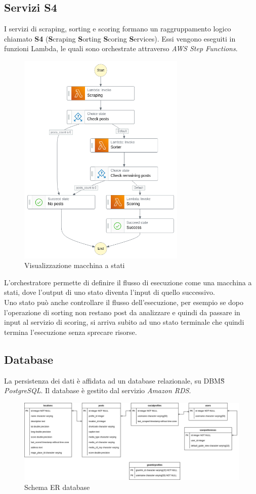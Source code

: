 \subsection{Servizi S4}
I servizi di scraping, sorting e scoring formano un raggruppamento logico chiamato \textbf{S4} (\textbf{S}craping \textbf{S}orting \textbf{S}coring \textbf{S}ervices).
Essi vengono eseguiti in funzioni Lambda, le quali sono orchestrate attraverso \textit{AWS Step Functions}.
\begin{figure}[H]
    \includegraphics[width=8cm]{sezioni/images/stepfunctions_graph.png}
    \centering
    \caption{Visualizzazione macchina a stati}
\end{figure}
L'orchestratore permette di definire il flusso di esecuzione come una macchina a stati, dove l'output di uno stato
diventa l'input di quello successivo.\\
Uno stato può anche controllare il flusso dell'esecuzione, per esempio se dopo
l'operazione di sorting non restano post da analizzare e quindi da passare in input al servizio di scoring, si arriva
subito ad uno stato terminale che quindi termina l'esecuzione senza sprecare risorse.

\newpage

\subsection{Database}
La persistenza dei dati è affidata ad un database relazionale, su DBMS\G{} \textit{PostgreSQL}.
Il database è gestito dal servizio \textit{Amazon RDS}.
\begin{figure}[H]
    \includegraphics[width=15cm]{sezioni/images/db_er.png}
    \centering
    \caption{Schema ER database}
\end{figure}


